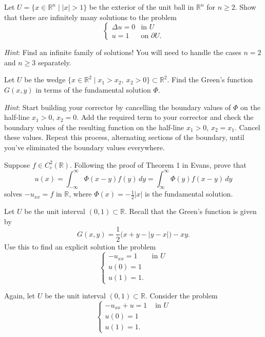 \documentclass[12pt,fleqn]{exam}
\newcommand{\R}{\ensuremath{\mathbb{R}}}
\begin{document}
\begin{questions}

\question Let $U = \{x \in \R^n \mid |x| > 1\}$ be the exterior of the unit ball in $\R^n$ for $n \geq 2$. Show that there are infinitely many solutions to the problem
\[\begin{cases}
\Delta u = 0 & \text{in } U \\
u = 1 & \text{on } \partial U .
\end{cases}\]

\emph{Hint}: Find an infinite family of solutions! You will need to handle the cases $n = 2$ and $n \geq 3$ separately.

\question Let $U$ be the wedge $\{x \in \mathbb{R}^2 \mid x_1 > x_2,\ x_2 > 0\} \subset \R^2$. Find the Green's function $G(x,y)$ in terms of the fundamental solution $\Phi$.

\vspace{1ex}\emph{Hint}: Start building your corrector by cancelling the boundary values of $\Phi$ on the half-line $x_1 > 0$, $x_2 = 0$. Add the required term to your corrector and check the boundary values of the resulting function on the half-line $x_1 > 0$, $x_2 = x_1$. Cancel these values. Repeat this process, alternating sections of the boundary, until you've eliminated the boundary values everywhere.

\question Suppose $f \in C^2_c(\R)$. Following the proof of Theorem 1 in Evans, prove that
\[u(x) = \int_{-\infty}^{\infty} \Phi(x-y) f(y)\,dy = \int_{\infty}^{\infty} \Phi(y) f(x-y)\,dy\]
solves $-u_{xx} = f$ in $\R$, where $\Phi(x) = -\frac12 |x|$ is the fundamental solution.

\question Let $U$ be the unit interval $(0,1) \subset \R$. Recall that the Green's function is given by
\[G(x,y) = \frac12 \big(x+y-|y-x|\big) - xy.\]
Use this to find an explicit solution the problem
\[
\begin{cases}
-u_{xx} = 1 & \text{ in $U$} \\
u(0) = 1 \\
u(1) = 1.
\end{cases}
\]

\question Again, let $U$ be the unit interval $(0,1) \subset \R$. Consider the problem
\[
\begin{cases}
-u_{xx} + u = 1 & \text{ in $U$} \\
u(0) = 1 \\
u(1) = 1.
\end{cases}
\]


\end{questions}
\end{document}
